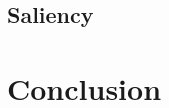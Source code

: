 \documentclass[12pt,a4paper,twoside,openright]{report}
\renewcommand{\baselinestretch}{1.1}    %
\begin{document}
\section{Saliency}

\chapter{Conclusion}



 
 



\end{document}
